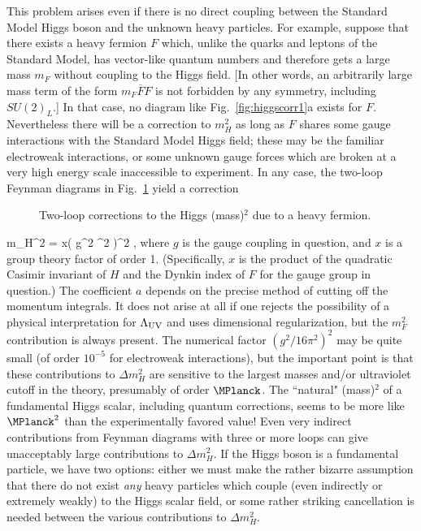 This problem arises even if there is no direct coupling
between the Standard Model Higgs boson and the unknown heavy particles.
For example,
suppose that there exists a heavy fermion $F$ which, unlike the
quarks and leptons of the Standard Model, has vector-like
quantum numbers and therefore gets a large mass $m_F$ without
coupling to the Higgs field. [In other words, an arbitrarily large mass
term of the form
$m_F \overline F F$ is not forbidden by any symmetry, including
$SU(2)_L$.] In
that case, no diagram like
Fig.~\ref{fig:higgscorr1}a exists for $F$. Nevertheless there
will be a correction to
$m_H^2$ as long as $F$ shares
some gauge interactions with the Standard Model Higgs field; these may
be the familiar electroweak interactions, or some unknown gauge
forces which are broken at a very high energy scale inaccessible
to experiment. In any case, the two-loop
Feynman diagrams in Fig.~\ref{fig:higgscorr2}  yield a correction
\begin{figure}
\centerline{}
\caption{Two-loop corrections to the Higgs (mass)$^2$ due to a heavy
fermion.
\label{fig:higgscorr2}}
\end{figure}
\beq
\Delta m_H^2 = x\left ( {g^2  \pi^2} \right )^2
,
\label{quaddiv3}
\eeq
where $g$ is the gauge coupling in question, and $x$ is a group theory
factor of order 1. (Specifically, $x$ is the product of the
quadratic Casimir invariant of $H$ and the Dynkin index of $F$
for the gauge group in question.)
The coefficient $a$ depends on the precise method of cutting
off the momentum integrals. It does not arise at all if
one rejects the possibility of
a physical interpretation for $\Lambda_{\rm UV}$ and uses
dimensional regularization, but the $m_F^2$
contribution is always present.
The numerical factor $(g^2/16 \pi^2)^2$ may be quite small (of order
$10^{-5}$ for electroweak interactions), but the important
point is that these contributions
to $\Delta m_H^2$ are sensitive to
the largest masses and/or ultraviolet cutoff in the theory, presumably
of order $\MPlanck$. The ``natural" (mass)$^2$ of a fundamental Higgs
scalar, including quantum corrections, seems to be more like $\MPlanck^2$
than the experimentally favored value!
Even very indirect contributions from
Feynman diagrams with three or more
loops can give unacceptably
large contributions
to $\Delta m_H^2$.
If the Higgs boson is a fundamental particle,
we have two options: either we must make
the rather bizarre assumption that there do not exist {\it any}
heavy particles which couple (even indirectly or extremely weakly)
to the Higgs scalar field,
or some rather striking cancellation is needed between the various
contributions to $\Delta m_H^2$.

